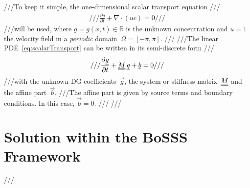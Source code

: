 {///To keep it simple, the one-dimensional scalar transport equation
///\begin{align} \label{eq:scalarTransport}
///\frac{\partial g}{\partial t} + \nabla \cdot \left(uc\right) = 0
///\end{align}
///will be used, where $g=g(x,t) \in \mathbb{R}$ is the unknown concentration and $u=1$ the velocity field in a \emph{periodic} domain~$\Omega = \left[-\pi,\pi\right]$.
///
///The linear PDE~\eqref{eq:scalarTransport} can be written in its semi-discrete form
///\begin{align} \label{eq:semiDiscreteForm}
///\frac{\partial \vec g}{\partial t} + \matrix{M} \, \vec g + \vec b = 0
///\end{align}
///with the unknown DG coefficients~$\vec g$, the system or stiffness matrix~$\underline{\underline{M}}$ and the affine part~$\vec b$. 
///The affine part is given by source terms and boundary conditions. In this case, $\vec b = 0$.
///
///\section{Solution within the BoSSS Framework}
///\label{sec:scalarConvection_tutorial}
 }
\BoSSSexeSilent
{}
\BoSSSexe
{}
\BoSSSexe
{}
\BoSSSexe
{}
\BoSSSexe
